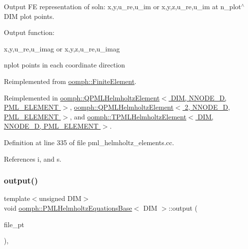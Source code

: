 Output FE representation of soln\+: x,y,u\+\_\+re,u\+\_\+im or x,y,z,u\+\_\+re,u\+\_\+im at n\+\_\+plot$^\wedge$\+D\+IM plot points. 

Output function\+:

x,y,u\+\_\+re,u\+\_\+imag or x,y,z,u\+\_\+re,u\+\_\+imag

nplot points in each coordinate direction 

Reimplemented from \hyperlink{classoomph_1_1FiniteElement_afa9d9b2670f999b43e6679c9dd28c457}{oomph\+::\+Finite\+Element}.



Reimplemented in \hyperlink{classoomph_1_1QPMLHelmholtzElement_a2a9014358af0d72ff3e06d11286beb84}{oomph\+::\+Q\+P\+M\+L\+Helmholtz\+Element$<$ D\+I\+M, N\+N\+O\+D\+E\+\_\+D, P\+M\+L\+\_\+\+E\+L\+E\+M\+E\+N\+T $>$}, \hyperlink{classoomph_1_1QPMLHelmholtzElement_a2a9014358af0d72ff3e06d11286beb84}{oomph\+::\+Q\+P\+M\+L\+Helmholtz\+Element$<$ 2, N\+N\+O\+D\+E\+\_\+D, P\+M\+L\+\_\+\+E\+L\+E\+M\+E\+N\+T $>$}, and \hyperlink{classoomph_1_1TPMLHelmholtzElement_aa261cc229bf205167b1105e55385862b}{oomph\+::\+T\+P\+M\+L\+Helmholtz\+Element$<$ D\+I\+M, N\+N\+O\+D\+E\+\_\+D, P\+M\+L\+\_\+\+E\+L\+E\+M\+E\+N\+T $>$}.



Definition at line 335 of file pml\+\_\+helmholtz\+\_\+elements.\+cc.



References i, and s.

\mbox{\label{classoomph_1_1PMLHelmholtzEquationsBase_acabc2ace55a6f69cd3ef62fe82dc1790}} 
\subsubsection{\texorpdfstring{output()}{output()}\hspace{0.1cm}{\footnotesize\ttfamily [3/4]}}
{\footnotesize\ttfamily template$<$unsigned D\+IM$>$ \\
void \hyperlink{classoomph_1_1PMLHelmholtzEquationsBase}{oomph\+::\+P\+M\+L\+Helmholtz\+Equations\+Base}$<$ D\+IM $>$\+::output (\begin{DoxyParamCaption}\item[{F\+I\+LE $\ast$}]{file\+\_\+pt }\end{DoxyParamCaption})\hspace{0.3cm}{\ttfamily [inline]}, {\ttfamily [virtual]}}



